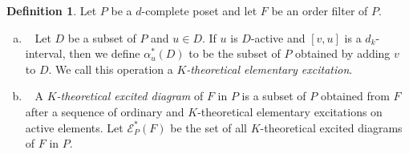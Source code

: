 \documentclass[10pt]{amsart}
\theoremstyle{definition}
\newtheorem{defi}[theo]{Definition}
\theoremstyle{remark}
\newcommand\EE{\mathcal{E}}
\begin{document}
\begin{defi}
\label{def:K-excited}
Let $P$ be a $d$-complete poset and let $F$ be an order filter of $P$.
\begin{enumerate}[(a)]
\item~\label{defi3.9_a} %
Let $D$ be a subset of $P$ and $u \in D$.
If $u$ is $D$-active and $[v,u]$ is a $d_k$-interval, 
then we define $\alpha^*_u(D)$ to be the subset of $P$ obtained by 
adding $v$ to $D$.
We call this operation a \emph{$K$-theoretical elementary excitation}.
\item~\label{defi3.9_b} %
A \emph{$K$-theoretical excited diagram} of $F$ in $P$ is a subset of $P$ 
obtained from $F$ after a sequence of ordinary and $K$-theoretical elementary excitations on active elements. 
Let $\EE^*_P(F)$ be the set of all $K$-theoretical excited diagrams of $F$ in $P$.
\end{enumerate}
\end{defi}
\end{document}
